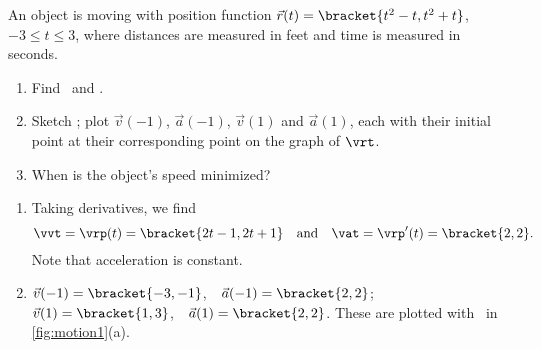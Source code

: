 \begin{example}\label{ex_motion1}
An object is moving with position function $\vec r(t) =\bracket{t^2-t,t^2+t}$, $-3\leq t\leq 3$, where distances are measured in feet and time is measured in seconds.
\begin{enumerate}
	\item Find \vvt\  and \vat.
	\item	Sketch \vrt; plot $\vec v(-1)$, $\vec a(-1)$, $\vec v(1)$ and $\vec a(1)$, each with their initial point at their corresponding point on the graph of $\vrt$.
	\item	When is the object's speed minimized?
\end{enumerate}
\solution
\begin{enumerate}
	\item Taking derivatives, we find
	\[\vvt = \vrp(t) =\bracket{2t-1,2t+1}\quad \text{and} \quad \vat = \vrp'(t) =\bracket{2,2}.\]
	Note that acceleration is constant.

	\item		$\vec v(-1) =\bracket{-3,-1}$,\ \ $\vec a(-1) =\bracket{2,2}$; \quad $\vec v(1) =\bracket{1,3}$,\ \ $\vec a(1) =\bracket{2,2}$. These are plotted with \vrt\ in \autoref{fig:motion1}(a).
	

\end{enumerate}
\end{example}
